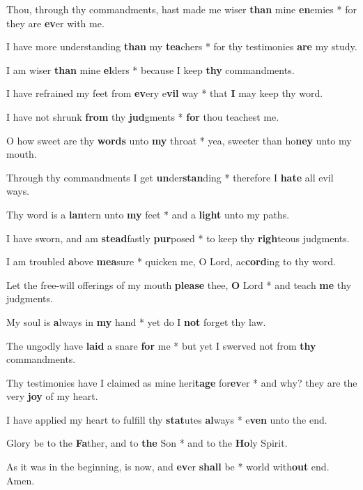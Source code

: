 \begin{multicols}{2}
	Thou, through thy commandments, hast made me wiser \textbf{than} mine \textbf{en}emies * for they are \textbf{ev}er with me.
	
	I have more understanding \textbf{than} my \textbf{tea}chers * for thy testimonies \textbf{are} my study.
	
	I am wiser \textbf{than} mine \textbf{el}ders * because I keep \textbf{thy} commandments.
	
	I have refrained my feet from \textbf{ev}ery e\textbf{vil} way * that \textbf{I} may keep thy word.
	
	I have not shrunk \textbf{from} thy \textbf{jud}gments * \textbf{for} thou teachest me.
	
	O how sweet are thy \textbf{words} unto \textbf{my} throat * yea, sweeter than ho\textbf{ney} unto my mouth.
	
	Through thy commandments I get \textbf{un}der\textbf{stan}ding * therefore I \textbf{hate} all evil ways.
	
	Thy word is a \textbf{lan}tern unto \textbf{my} feet * and a \textbf{light} unto my paths.
	
	I have sworn, and am \textbf{stead}fastly \textbf{pur}posed * to keep thy \textbf{righ}teous judgments.
	
	I am troubled \textbf{a}bove \textbf{mea}sure * quicken me, O Lord, ac\textbf{cord}ing to thy word.
	
	Let the free-will offerings of my mouth \textbf{please} thee, \textbf{O} Lord * and teach \textbf{me} thy judgments.
	
	My soul is \textbf{a}lways in \textbf{my} hand * yet do I \textbf{not} forget thy law.
	
	The ungodly have \textbf{laid} a snare \textbf{for} me * but yet I swerved not from \textbf{thy} commandments.
	
	Thy testimonies have I claimed as mine heri\textbf{tage} for\textbf{ev}er * and why? they are the very \textbf{joy} of my heart.
	
	I have applied my heart to fulfill thy \textbf{stat}utes \textbf{al}ways * e\textbf{ven} unto the end.
	
	Glory be to the \textbf{Fa}ther, and to \textbf{the} Son * and to the \textbf{Ho}ly Spirit.
	
	As it was in the beginning, is now, and \textbf{ev}er \textbf{shall} be * world with\textbf{out} end. Amen.
\end{multicols}